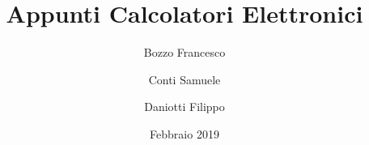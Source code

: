\documentclass[a4paper,12pt]{book}
\begin{document}
\author{Bozzo Francesco \and Conti Samuele \and Daniotti Filippo}
\title{Appunti Calcolatori Elettronici}
\date{Febbraio 2019}

\frontmatter
\maketitle
\tableofcontents

\mainmatter






\backmatter
\end{document}
